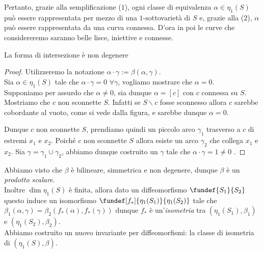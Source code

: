 Pertanto, grazie alla semplificazione ($1$), ogni classe di equivalenza  $\alpha \in \eta_1(S)$ può essere rappresentata per mezzo di una $1$-sottovarietà di $S$ e, grazie alla ($2$), $\alpha$ può essere rappresentata da una curva connessa. D'ora in poi le curve che considereremo saranno belle lisce, iniettive e connesse.

\begin{teo}
 La forma di intersezione è non degenere
\end{teo}

\begin{proof}
Utilizzeremo la notazione $\alpha \cdot \gamma := \beta(\alpha,\gamma)$. \\
Sia $\alpha \in \eta_1(S)$ tale che $\alpha \cdot \gamma = 0$  $\forall \gamma$, vogliamo mostrare che  $\alpha = 0$. \\
Supponiamo per assurdo che $\alpha \neq 0$, sia dunque $\alpha = [c]$ con $c$ connessa su $S$. \\
Mostriamo che $c$ non sconnette $S$. Infatti se $S \backslash c$ fosse sconnesso allora $c$ sarebbe cobordante al vuoto, come si vede dalla figura, e sarebbe dunque $\alpha = 0$.
\begin{center}
  
\end{center}
Dunque $c$ non sconnette $S$, prendiamo quindi un piccolo arco $\gamma_1$ trasverso a $c$ di estremi $x_1$ e $x_2$. Poiché $c$ non sconnette $S$ allora esiste un arco $\gamma_2$ che collega $x_1$ e $x_2$. Sia $\gamma = \gamma_1 \cup \gamma_2$, abbiamo dunque costruito un $\gamma$ tale che $\alpha \cdot \gamma = 1 \neq 0$ \absurd.
\end{proof}
\begin{center}
  
\end{center}

\begin{oss}
Abbiamo visto che $\beta$ è bilineare, simmetrica e non degenere, dunque $\beta$ è un \emph{prodotto scalare}. \\
Inoltre $\dim \eta_1(S)$ è finita, allora dato un diffeomorfismo $\fundef{S_1}{S_2}$ questo induce un isomorfismo $\fundef[f_*]{\eta_1(S_1)}{\eta_1(S_2)}$ tale che $\beta_1(\alpha,\gamma) = \beta_2(f_*(\alpha),f_*(\gamma))$ dunque $f_*$ è un'\emph{isometria} tra $(\eta_1(S_1), \beta_1)$ e $(\eta_1(S_2), \beta_2)$. \\
Abbiamo costruito un nuovo invariante per diffeomorfismi: la classe di isometria di $(\eta_1(S), \beta)$.
\end{oss}